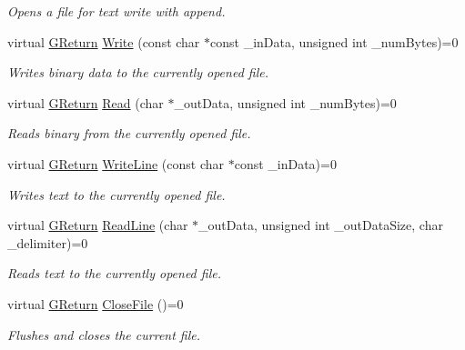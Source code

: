 \begin{DoxyCompactItemize}
\begin{DoxyCompactList}\small\item\em Opens a file for text write with append. \end{DoxyCompactList}\item 
virtual \mbox{\hyperlink{namespaceGW_a67a839e3df7ea8a5c5686613a7a3de21}{G\+Return}} \mbox{\hyperlink{classGW_1_1SYSTEM_1_1GFile_ae9906414c159e9f1156b5ff6ad511c31}{Write}} (const char $\ast$const \+\_\+in\+Data, unsigned int \+\_\+num\+Bytes)=0
\begin{DoxyCompactList}\small\item\em Writes binary data to the currently opened file. \end{DoxyCompactList}\item 
virtual \mbox{\hyperlink{namespaceGW_a67a839e3df7ea8a5c5686613a7a3de21}{G\+Return}} \mbox{\hyperlink{classGW_1_1SYSTEM_1_1GFile_a1aaa026cba3d37abaaa2b408cd5d322d}{Read}} (char $\ast$\+\_\+out\+Data, unsigned int \+\_\+num\+Bytes)=0
\begin{DoxyCompactList}\small\item\em Reads binary from the currently opened file. \end{DoxyCompactList}\item 
virtual \mbox{\hyperlink{namespaceGW_a67a839e3df7ea8a5c5686613a7a3de21}{G\+Return}} \mbox{\hyperlink{classGW_1_1SYSTEM_1_1GFile_a7c57570575c63ae98f71232660d1b911}{Write\+Line}} (const char $\ast$const \+\_\+in\+Data)=0
\begin{DoxyCompactList}\small\item\em Writes text to the currently opened file. \end{DoxyCompactList}\item 
virtual \mbox{\hyperlink{namespaceGW_a67a839e3df7ea8a5c5686613a7a3de21}{G\+Return}} \mbox{\hyperlink{classGW_1_1SYSTEM_1_1GFile_ae9e072091ffe55f2f7697cb1d3eaec79}{Read\+Line}} (char $\ast$\+\_\+out\+Data, unsigned int \+\_\+out\+Data\+Size, char \+\_\+delimiter)=0
\begin{DoxyCompactList}\small\item\em Reads text to the currently opened file. \end{DoxyCompactList}\item 
virtual \mbox{\hyperlink{namespaceGW_a67a839e3df7ea8a5c5686613a7a3de21}{G\+Return}} \mbox{\hyperlink{classGW_1_1SYSTEM_1_1GFile_ae661d107c461145bb095dcfc76519f54}{Close\+File}} ()=0
\begin{DoxyCompactList}\small\item\em Flushes and closes the current file. \end{DoxyCompactList}\item 

\end{DoxyCompactItemize}
